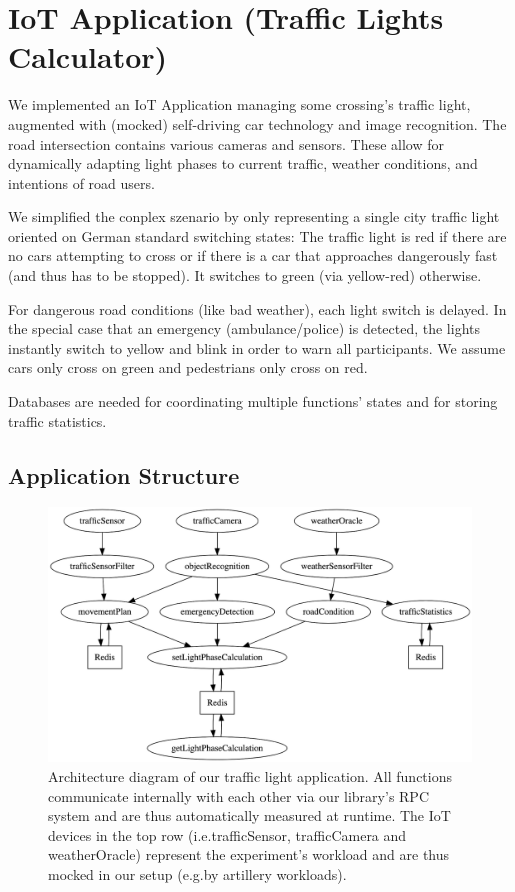 \documentclass[../main.tex]{subfiles}
\begin{document}
\section{IoT Application (Traffic Lights Calculator)}\label{sec:iot}

We implemented an IoT Application managing some crossing's traffic light, 
augmented with (mocked) self-driving car technology and image recognition. 
The road intersection contains various cameras and sensors. 
These allow for dynamically adapting light phases to current traffic, 
weather conditions, and intentions of road users. 

We simplified the conplex szenario by only representing a single city traffic light oriented on German standard switching states:
The traffic light is red if there are no cars attempting to cross 
or if there is a car that approaches dangerously fast (and thus has to be stopped). 
It switches to green (via yellow-red) otherwise. 

For dangerous road conditions (like bad weather), each light switch is delayed. 
In the special case that an emergency (ambulance/police) is detected, 
the lights instantly switch to yellow and blink 
in order to warn all participants. 
We assume cars only cross on green and pedestrians only cross on red.

Databases are needed for coordinating multiple functions' states
and for storing traffic statistics.


\subsection{Application Structure}\label{ssec:iotApplicationStructure}

\begin{figure}
\begin{center}
  \includegraphics[width=\linewidth,keepaspectratio]{./iot-architecture-diagram.png}
\end{center}
\caption[IoT Architecture Diagram]{%
  Architecture diagram of our traffic light application.
  All functions communicate internally with each other via our library's RPC system
  and are thus automatically measured at runtime.
  The IoT devices in the top row (i.e.\@ trafficSensor, trafficCamera and weatherOracle) 
  represent the experiment's workload and are thus mocked in our setup (e.g.\@ by artillery workloads).%
}%
\label{fig:iotArchitectureDiagram}
\end{figure}
\end{document}
